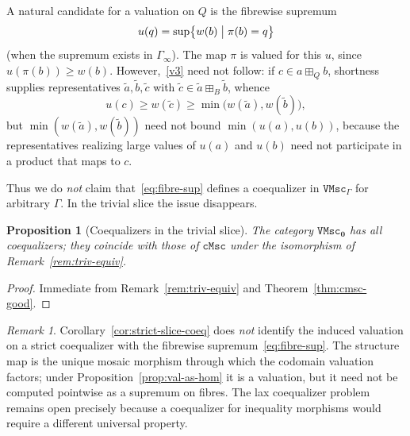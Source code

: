 \documentclass[11pt]{amsart}
\theoremstyle{plain}
\newtheorem{proposition}[theorem]{Proposition}
\theoremstyle{definition}
\theoremstyle{remark}
\newtheorem{remark}[theorem]{Remark}
\newcommand{\cMsc}{\mathtt{cMsc}}
\newcommand{\VMsc}{\mathtt{VMsc}}
\newcommand{\VMscG}{\mathtt{VMsc}_{\Gamma}}
\begin{document}
A natural candidate for a valuation on \(Q\) is the fibrewise supremum
\begin{equation}
\label{eq:fibre-sup}
u(q)=\sup\bigl\{w(b)\bigm| \pi(b)=q\bigr\}
\end{equation}
(when the supremum exists in \(\Gamma_\infty\)). The map \(\pi\) is valued for this \(u\), since \(u(\pi(b))\ge w(b)\). However,~\eqref{v3} need not follow: if \(c\in a\boxplus_Q b\), shortness supplies representatives \(\tilde a,\tilde b,\tilde c\) with \(\tilde c\in\tilde a\boxplus_B\tilde b\), whence
\[
u(c)\ge w(\tilde c)\ge\min\bigl(w(\tilde a),w(\tilde b)\bigr),
\]
but \(\min(w(\tilde a),w(\tilde b))\) need not bound \(\min(u(a),u(b))\), because the representatives realizing large values of \(u(a)\) and \(u(b)\) need not participate in a product that maps to \(c\).

Thus we do \emph{not} claim that~\eqref{eq:fibre-sup} defines a coequalizer in \(\VMscG\) for arbitrary \(\Gamma\). In the trivial slice the issue disappears.

\begin{proposition}[Coequalizers in the trivial slice]
\label{prop:coeq-triv}
The category \(\VMsc_{\mathbf{0}}\) has all coequalizers; they coincide with those of \(\cMsc\) under the isomorphism of Remark~\ref{rem:triv-equiv}.
\end{proposition}

\begin{proof}
Immediate from Remark~\ref{rem:triv-equiv} and Theorem~\ref{thm:cmsc-good}.
\end{proof}


\begin{remark}
\label{rem:strict-coeq-vs-fibre-sup}
Corollary~\ref{cor:strict-slice-coeq} does \emph{not} identify the induced valuation on a strict coequalizer with the fibrewise supremum~\eqref{eq:fibre-sup}. The structure map is the unique mosaic morphism through which the codomain valuation factors; under Proposition~\ref{prop:val-as-hom} it is a valuation, but it need not be computed pointwise as a supremum on fibres. The lax coequalizer problem remains open precisely because a coequalizer for inequality morphisms would require a different universal property.
\end{remark}
\end{document}
